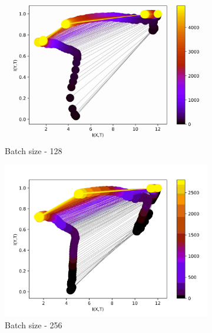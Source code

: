 \documentclass[dissertation.tex]{subfiles}
\begin{document}
\begin{figure}[ht]
  \begin{subfigure}[t]{0.3332\textwidth}
    \centering
    \includegraphics[width=\textwidth]{figs/eval/batchSize/Binning128.jpg}
    \caption{
      Batch size - 128
    }
    \label{figBatchSize128}
  \end{subfigure}
  \centering
  \begin{subfigure}[t]{0.3\textwidth}
    \centering
    \includegraphics[width=\textwidth]{figs/eval/batchSize/Binning256.jpg}
    \caption{
      Batch size - 256
    }
    \label{figBatchSize256}
  \end{subfigure}
  \begin{subfigure}[t]{0.3332\textwidth}

\end{subfigure}
\end{figure}
\end{document}

